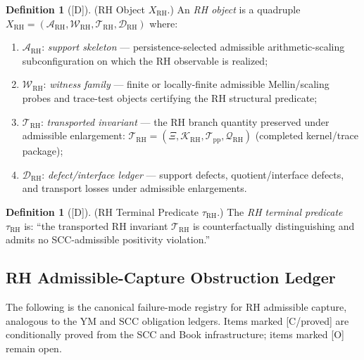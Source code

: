 \documentclass[12pt,oneside]{amsbook}
\theoremstyle{plain}
\theoremstyle{definition}
\newtheorem{definition}[theorem]{Definition}
\theoremstyle{remark}
\newcommand{\status}[1]{\textup{[#1]}}
\begin{document}
\begin{definition}[\status{D}]\label{def:RH-object}
\textup{(RH Object $X_{\mathrm{RH}}$.)}
An \emph{RH object} is a quadruple
$X_{\mathrm{RH}} = (\mathcal{A}_{\mathrm{RH}}, \mathcal{W}_{\mathrm{RH}},
\mathcal{T}_{\mathrm{RH}}, \mathcal{D}_{\mathrm{RH}})$ where:
\begin{enumerate}[label=\textup{(\arabic*)}]
 \item $\mathcal{A}_{\mathrm{RH}}$: \emph{support skeleton} ---
 persistence-selected admissible arithmetic-scaling
 subconfiguration on which the RH observable is realized;
 \item $\mathcal{W}_{\mathrm{RH}}$: \emph{witness family} ---
 finite or locally-finite admissible Mellin/scaling probes and
 trace-test objects certifying the RH structural predicate;
 \item $\mathcal{T}_{\mathrm{RH}}$: \emph{transported invariant}
 --- the RH branch quantity preserved under admissible
 enlargement: $\mathcal{T}_{\mathrm{RH}} =
 (\Xi, \mathcal{K}_{\mathrm{RH}}, \mathcal{T}_{\mathrm{pp}},
 \mathcal{Q}_{\mathrm{RH}})$ (completed kernel/trace package);
 \item $\mathcal{D}_{\mathrm{RH}}$: \emph{defect/interface ledger}
 --- support defects, quotient/interface defects, and transport
 losses under admissible enlargements.
\end{enumerate}
\end{definition}

\begin{definition}[\status{D}]\label{def:RH-terminal-predicate}
\textup{(RH Terminal Predicate $\tau_{\mathrm{RH}}$.)}
The \emph{RH terminal predicate} $\tau_{\mathrm{RH}}$ is: ``the
transported RH invariant $\mathcal{T}_{\mathrm{RH}}$ is
counterfactually distinguishing and admits no SCC-admissible
positivity violation.''
\end{definition}

\subsection{RH Admissible-Capture Obstruction Ledger}

The following is the canonical failure-mode registry for RH
admissible capture, analogous to the YM and SCC obligation ledgers.
Items marked \textup{[C/proved]} are conditionally proved from
the SCC and Book infrastructure; items marked \textup{[O]} remain open.
\end{document}
